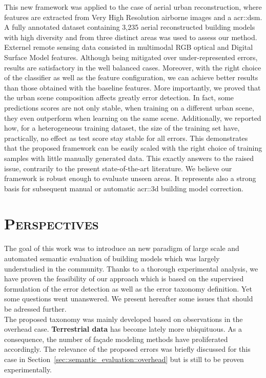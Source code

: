     This new framework was applied to the case of aerial urban reconstruction, where features are extracted from Very High Resolution airborne images and a \acrlong{acr::dsm}.
    A fully annotated dataset containing 3,235 aerial reconstructed building models with high diversity and from three distinct areas was used to assess our method.
    Externel remote sensing data consisted in multimodal RGB optical and Digital Surface Model features.
    Although being mitigated over under-represented errors, results are satisfactory in the well balanced cases.
    Moreover, with the right choice of the classifier as well as the feature configuration, we can achieve better results than those obtained with the baseline features.
    More importantly, we proved that the urban scene composition affects greatly error detection.
    In fact, some predictions scores are not only stable, when training on a different urban scene, they even outperform when learning on the same scene.
    Additionally, we reported how, for a heterogeneous training dataset, the size of the training set have, practically, no effect as test score stay stable for all errors.
    This demonstrates that the proposed framework can be easily scaled with the right choice of training samples with little manually generated data.
    This exactly answers to the raised issue, contrarily to the present state-of-the-art literature.
    We believe our framework is robust enough to evaluate unseen areas.
    It represents also a strong basis for subsequent manual or automatic \gls{acr::3d} building model correction.

\section{\textsc{Perspectives}}
    \label{sec::conclusion::perspectives}
    The goal of this work was to introduce an new paradigm of large scale and automated semantic evaluation of building models which was largely understudied in the community.
    Thanks to a thorough experimental analysis, we have proven the feasibility of our approach which is based on the supervised formulation of the error detection as well as the error taxonomy definition.
    Yet some questions went unanswered.
    We present hereafter some issues that should be adressed further.\\

    The proposed taxonomy was mainly developed based on observations in the overhead case.
    \textbf{Terrestrial data} has become lately more ubiquituous.
    As a consequence, the number of façade modeling methods have proliferated accordingly.
    The relevance of the proposed errors was briefly discussed for this case in Section~\ref{sec::semantic_evaluation::overhead} but is still to be proven experimentally.\\

